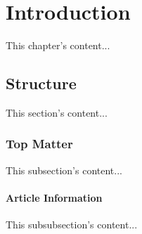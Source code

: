 \documentclass[12pt,a4paper,fleqn]{report}
\title{\bf \TITLE}
\author{\AUTHOR}
\begin{document}
  
  \restoregeometry


  \setcounter{secnumdepth}{3} %
  \setcounter{tocdepth}{3} %

  \pagestyle{empty} %

  \cleardoublepage
  \tableofcontents %
  \listoffigures %
  \listoftables %


  \glsaddall
  \renewcommand*{\glossaryname}{Danh sách thuật ngữ}
  \renewcommand*{\acronymname}{Danh sách từ viết tắt}
  \renewcommand*{\entryname}{Tiếng Anh}
  \renewcommand*{\descriptionname}{Tiếng Việt}
  \printglossaries

  \chapter*{Introduction}
  This chapter's content...

  \section{Structure}
  This section's content...

  \subsection{Top Matter}
  This subsection's content...

  \subsubsection{Article Information}
  This subsubsection's content...
\end{document}
